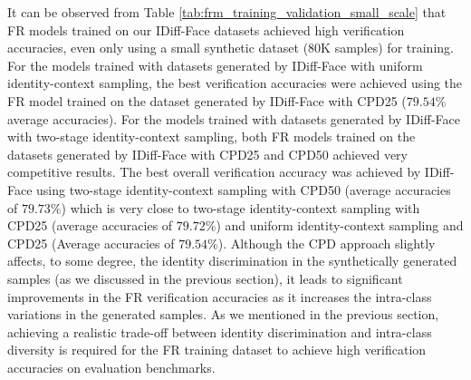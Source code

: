 \documentclass[10pt,twocolumn,letterpaper]{article}
\newcommand{\approachname}{IDiff-Face }
\begin{document}
It can be observed from Table \ref{tab:frm_training_validation_small_scale} that FR models trained on our \approachname datasets achieved high verification accuracies, even only using a small synthetic dataset ($80$K samples) for training.
For the models trained with datasets generated by \approachname with uniform identity-context sampling, the best verification accuracies were achieved using the FR model trained on the dataset generated by \approachname with CPD25 ($79.54\%$ average accuracies). For the models trained with datasets generated by \approachname with two-stage identity-context sampling, both FR models trained on  the datasets generated by \approachname with CPD25 and CPD50 achieved very competitive results. The best overall verification accuracy was achieved by \approachname using two-stage identity-context sampling with CPD50 (average accuracies of $79.73\%$) which is very close to two-stage identity-context sampling with CPD25 (average accuracies of $79.72\%$) and uniform identity-context sampling and CPD25 (Average accuracies of $79.54\%$). 
Although the CPD approach slightly affects, to some degree, the identity discrimination in the synthetically generated samples (as we discussed in the previous section), it leads to significant improvements in the FR verification accuracies as it increases the intra-class variations in the generated samples. As we mentioned in the previous section, achieving a realistic trade-off between identity discrimination and intra-class diversity is required for the FR training dataset to achieve high verification accuracies on evaluation benchmarks.
\end{document}
